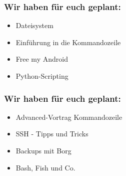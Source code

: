 \begin{frame}
\frametitle{Wir haben für euch geplant:}
	\begin{itemize}
		\item Dateisystem
		\item Einführung in die Kommandozeile
		\item Free my Android
		\item Python-Scripting
	\end{itemize}
\end{frame}

\begin{frame}
\frametitle{Wir haben für euch geplant:}
\begin{itemize}
	\item Advanced-Vortrag Kommandozeile
	\item SSH - Tipps und Tricks
	\item Backups mit Borg
	\item Bash, Fish und Co.
\end{itemize}
\end{frame}

